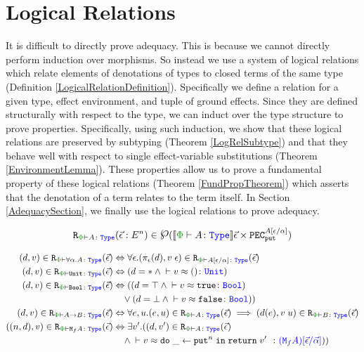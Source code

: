 \section{Logical Relations}
It is difficult to directly prove adequacy. This is because we cannot directly perform induction over morphisms. So instead we use a system of logical relations which relate elements of denotations of types to closed terms of the same type (Definition \ref{LogicalRelationDefinition}). Specifically we define a relation for a given type, effect environment, and tuple of ground effects. Since they are defined structurally with respect to the type, we can induct over the type structure to prove properties. Specifically, using such induction, we show that these logical relations are preserved by subtyping (Theorem \ref{LogRelSubtype}) and that they behave well with respect to single effect-variable substitutions (Theorem \ref{EnvironmentLemma}). These properties allow us to prove a fundamental property of these logical relations (Theorem \ref{FundPropTheorem}) which asserts that the denotation of a term relates to the term itself. In Section \ref{AdequacySection}, we finally use the logical relations to prove adequacy.

\begin{framed}
    \begin{definition}\label{LogicalRelationDefinition}
        \begin{equation}
            \label{LogicalRelationType}
            \erelates{\P}{A}(\ev: E^n) \in \powset{\deno{\wellformedt{\P}{A}}\ev\times \pecput^{A\ssub{\a}{\e}}}
        \end{equation}
   
        \begin{align*}
            \inLogRelPE{d}{v}{\all{\a}{A}} 
            & \Leftrightarrow \forall\e. (\pe(d), \eapp{v}{\e})\in\erelates{\P}{A\ssub{\a}{\e}}(\ev)\\
                    \inLogRelPE{d}{v}{\U} & \Leftrightarrow (d=\singleton \wedge \zberelation{v}{()}{\U})
                    \\
                    \inLogRelPE{d}{v}{\B} & \Leftrightarrow ((d=\top \wedge \zberelation{v}{\t}{\B}) 
                    \\& \quad\vee (d=\bot \wedge \zberelation{v}{\f}{\B}))
                    \\
                    \inLogRelPE{d}{v}{\ab}  &\Leftrightarrow \forall e, u. (e, u)\in\erelates{\P}{A}(\ev) \implies (d(e), \apply{v}{u})\in \erelates{\P}{B}(\ev)
                    \\
                    \inLogRelPE{(n, d)}{v}{\M{f}{A}} &\Leftrightarrow \exists v'. (\inLogRelPE{d}{v'}{A}
                    \\ & \quad\wedge  \zberelation{v}{\doin{\_}{\put^n}{\return{v'}}}{(\M{f}{A})\ssub{\av}{\ev}}))
        \end{align*}
    \end{definition}
        
\end{framed}

